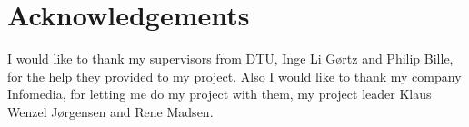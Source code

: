 \chapter{Acknowledgements}

I would like to thank my supervisors from DTU, Inge Li Gørtz and Philip Bille, for the help they provided to my project. Also I would like to thank my company Infomedia, for letting me do my project with them, my project leader Klaus Wenzel Jørgensen and Rene Madsen.

